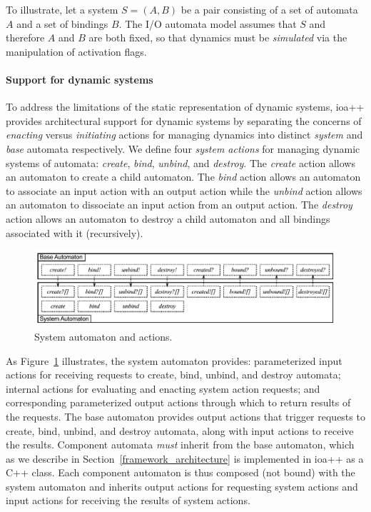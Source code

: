 To illustrate, let a system $S=(A,B)$ be a pair consisting of a set of automata $A$ and a set of bindings $B$.
The I/O automata model assumes that $S$ and therefore $A$ and $B$ are both fixed, so that dynamics must be \emph{simulated} via the manipulation of activation flags.

\paragraph*{Support for dynamic systems}
To address the limitations of the static representation of dynamic systems, ioa++ provides
architectural support for dynamic systems by separating the concerns of \emph{enacting} versus \emph{initiating} 
actions for managing dynamics into distinct \emph{system} and \emph{base} automata respectively.
We define four \emph{system actions} for managing dynamic systems of automata: \emph{create}, \emph{bind}, \emph{unbind}, and \emph{destroy}.
The \emph{create} action allows an automaton to create a child automaton.
The \emph{bind} action allows an automaton to associate an input action with an output action while the \emph{unbind} action allows an automaton to dissociate an input action from an output action.
The \emph{destroy} action allows an automaton to destroy a child automaton and all bindings associated with it (recursively).
\begin{figure}
\center
\includegraphics[width=\columnwidth]{system_action}
\caption{System automaton and actions.}
\label{system_action}
\end{figure}

As Figure~\ref{system_action} illustrates, the system automaton provides: parameterized input actions for receiving requests to create, bind, unbind, and destroy automata; internal actions for evaluating and enacting system action requests; and corresponding parameterized output actions through which to return results of the requests.
The base automaton provides output actions that trigger requests to create, bind, unbind, and destroy automata, along with
input actions to receive the results.
Component automata \emph{must} inherit from the base automaton, which as we describe in Section~\ref{framework_architecture} is implemented in ioa++ as a C++ class. Each component automaton is thus composed (not bound) with the system automaton and inherits output actions for requesting system actions and input actions for receiving the results of system actions.

